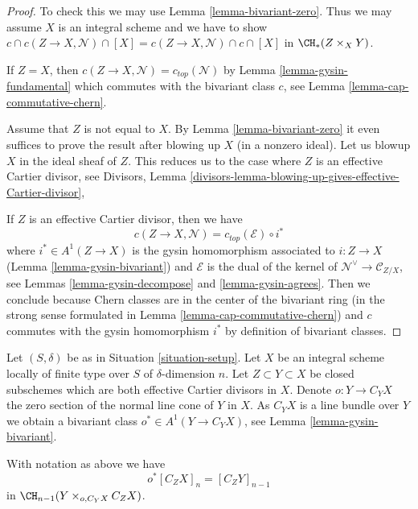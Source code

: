 \begin{proof}
To check this we may use Lemma \ref{lemma-bivariant-zero}.
Thus we may assume $X$ is an integral scheme and we have to show
$c \cap c(Z \to X, \mathcal{N}) \cap [X] =
c(Z \to X, \mathcal{N}) \cap c \cap [X]$ in $\CH_*(Z \times_X Y)$.

\medskip\noindent
If $Z = X$, then $c(Z \to X, \mathcal{N}) = c_{top}(\mathcal{N})$ by
Lemma \ref{lemma-gysin-fundamental} which commutes
with the bivariant class $c$, see Lemma \ref{lemma-cap-commutative-chern}.

\medskip\noindent
Assume that $Z$ is not equal to $X$. By Lemma \ref{lemma-bivariant-zero}
it even suffices to prove the result after blowing up $X$ (in a nonzero ideal).
Let us blowup $X$ in the ideal sheaf of $Z$. This reduces us to the case
where $Z$ is an effective Cartier divisor, see
Divisors, Lemma
\ref{divisors-lemma-blowing-up-gives-effective-Cartier-divisor},

\medskip\noindent
If $Z$ is an effective Cartier divisor, then we have
$$
c(Z \to X, \mathcal{N}) =
c_{top}(\mathcal{E}) \circ i^*
$$
where $i^* \in A^1(Z \to X)$ is the gysin homomorphism
associated to $i : Z \to X$ (Lemma \ref{lemma-gysin-bivariant})
and $\mathcal{E}$ is the dual of the kernel of
$\mathcal{N}^\vee \to \mathcal{C}_{Z/X}$, see
Lemmas \ref{lemma-gysin-decompose} and \ref{lemma-gysin-agrees}.
Then we conclude because Chern classes are in the center of the
bivariant ring (in the strong sense formulated in
Lemma \ref{lemma-cap-commutative-chern}) and $c$ commutes
with the gysin homomorphism $i^*$ by definition of bivariant classes.
\end{proof}

\noindent
Let $(S, \delta)$ be as in Situation \ref{situation-setup}. Let $X$ be an
integral scheme locally of finite type over $S$ of $\delta$-dimension $n$.
Let $Z \subset Y \subset X$ be closed subschemes which are both effective
Cartier divisors in $X$. Denote $o : Y \to C_Y X$ the zero section of the
normal line cone of $Y$ in $X$. As $C_YX$ is a line bundle over $Y$
we obtain a bivariant class $o^* \in A^1(Y \to C_YX)$, see
Lemma \ref{lemma-gysin-bivariant}.

\begin{lemma}
\label{lemma-relation-normal-cones}
With notation as above we have
$$
o^*[C_ZX]_n = [C_Z Y]_{n - 1}
$$
in $\CH_{n - 1}(Y \times_{o, C_Y X} C_ZX)$.
\end{lemma}

